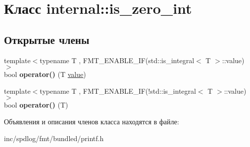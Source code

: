 \hypertarget{classinternal_1_1is__zero__int}{}\section{Класс internal\+:\+:is\+\_\+zero\+\_\+int}
\label{classinternal_1_1is__zero__int}
\subsection*{Открытые члены}
\begin{DoxyCompactItemize}
\item 
\mbox{\label{classinternal_1_1is__zero__int_aba8b9b3e6d3375c6e2b0323a80273673}} 
{\footnotesize template$<$typename T , F\+M\+T\+\_\+\+E\+N\+A\+B\+L\+E\+\_\+\+I\+F(std\+::is\+\_\+integral$<$ T $>$\+::value) $>$ }\\bool {\bfseries operator()} (T \hyperlink{classinternal_1_1value}{value})
\item 
\mbox{\label{classinternal_1_1is__zero__int_a32c70121c06cad6fde0bceb4d94df8f1}} 
{\footnotesize template$<$typename T , F\+M\+T\+\_\+\+E\+N\+A\+B\+L\+E\+\_\+\+I\+F(!std\+::is\+\_\+integral$<$ T $>$\+::value) $>$ }\\bool {\bfseries operator()} (T)
\end{DoxyCompactItemize}


Объявления и описания членов класса находятся в файле\+:\begin{DoxyCompactItemize}
\item 
inc/spdlog/fmt/bundled/printf.\+h\end{DoxyCompactItemize}
